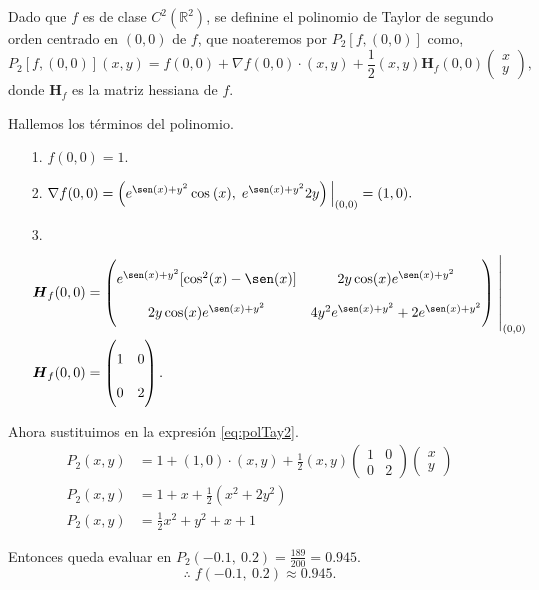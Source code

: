 \begin{solution}
    Dado que $f$ es de clase  $C^2(\mathbb{R}^2)$,  se definine  el polinomio de Taylor de segundo orden centrado en $(0,0)$ de $f$, que noateremos por $P_2[f,(0,0)]$ como, 
    \begin{equation}
    P_2[f,(0,0)](x,y)=f(0,0)+\nabla f(0,0)\cdot(x,y)+\frac{1}{2}(x,y)\boldsymbol{H}_f(0,0)\begin{pmatrix}x\\y\end{pmatrix}, \label{eq:polTay2}
    \end{equation}
    donde $\boldsymbol{H}_f$ es la matriz hessiana de $f$.

    Hallemos los  términos del polinomio.
    
    \begin{itemize}
    \item[1.] $f(0,0)=1.$
    \item[2.] $ \nabla f(0,0) = \left(e^{\sen(x)+y^2}\cos\:(x),\;e^{\sen(x)+y^2}2y\right)\Big\rvert_{(0,0)}=(1,0).$
    \item[3.] \begin{align*}
   \boldsymbol{H}_f(0,0)&=\left(
\renewcommand{\arraystretch}{2} %
\begin{matrix}
   e^{\sen(x)+y^2}[\cos^2(x)-\sen(x)]  & 2y\cos(x)e^{\sen(x)+y^2} \\
       2y\cos(x)e^{\sen(x)+y^2}  & 4y^2e^{\sen(x)+y^2}+2e^{\sen(x)+y^2} 
    \end{matrix}\right)\left.\rule{0pt}{1.1cm}\right\rvert_{(0,0)}\\
   \boldsymbol{H}_f(0,0)&=\left(\begin{matrix}
        1&0\\0&2
    \end{matrix}\right).
    \end{align*}
\end{itemize}

Ahora sustituimos en la expresión \eqref{eq:polTay2}.
\begin{align*}
P_2(x,y)&=1+(1,0)\cdot(x,y)+\frac{1}{2}(x,y)\left(\begin{matrix}1&0\\0&2\end{matrix}\right)\begin{pmatrix}x\\y\end{pmatrix}\\
P_2(x,y)&=1+x+\frac{1}{2}(x^2+2y^2)\\
P_2(x,y)&=\frac{1}{2}x^2+y^2+x+1 
\end{align*}

   Entonces queda evaluar en $P_2\left(-0\text{.}1,\:0\text{.}2\right) = \frac{189}{200} = 0\text{.}945$.
    $$\therefore\;f\left(-0\text{.}1,\:0\text{.}2\right)\approx0\text{.}945.$$
\end{solution}

